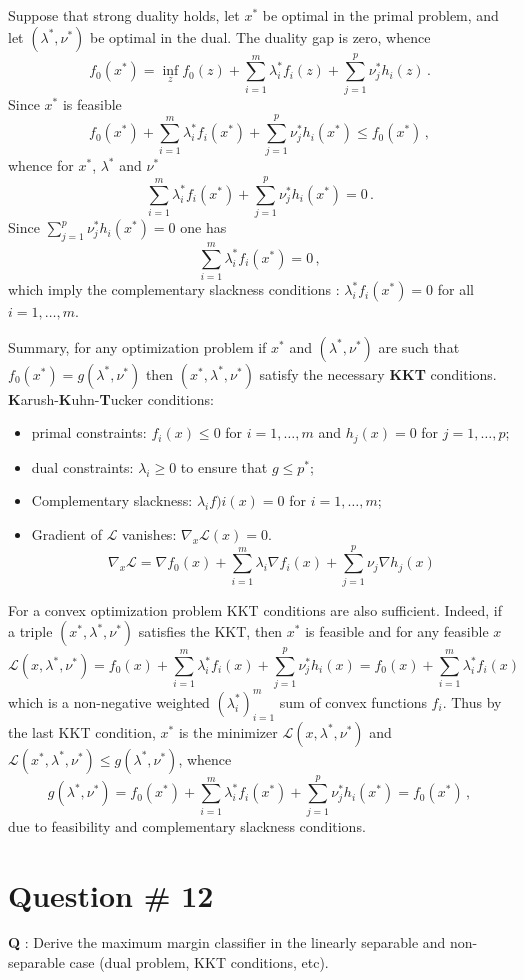 \documentclass[a4paper]{article}
\newcommand{\Lcal}{\mathcal{L}}
\begin{document}
Suppose that strong duality holds, let $x^*$ be optimal in the primal problem, and
let $(\lambda^*, \nu^*)$ be optimal in the dual. The duality gap is zero, whence
\[
f_0(x^*)
= \inf_z f_0(z) + \sum_{i=1}^m\lambda_i^* f_i(z) + \sum_{j=1}^p\nu_j^* h_i(z)\,.
\]
Since $x^*$ is feasible
\[
f_0(x^*) + \sum_{i=1}^m\lambda_i^* f_i(x^*) + \sum_{j=1}^p\nu_j^* h_i(x^*)
\leq f_0(x^*)\,,
\]
whence for $x^*$, $\lambda^*$ and $\nu^*$
\[
\sum_{i=1}^m \lambda_i^* f_i(x^*) + \sum_{j=1}^p\nu_j^* h_i(x^*) = 0 \,.
\]
Since $ \sum_{j=1}^p\nu_j^* h_i(x^*) = 0$ one has
\[ \sum_{i=1}^m \lambda_i^* f_i(x^*) = 0 \,,\]
which imply the complementary slackness conditions : $\lambda_i^* f_i(x^*) = 0$
for all $i=1,\ldots,m$.

Summary, for any optimization problem if $x^*$ and $(\lambda^*,\nu^*)$ are such that
$f_0(x^*) = g(\lambda^*,\nu^*)$ then $(x^*,\lambda^*,\nu^*)$ satisfy the necessary
\textbf{KKT} conditions.
\textbf{K}arush-\textbf{K}uhn-\textbf{T}ucker conditions:
\begin{itemize}
	\item primal constraints: $f_i(x)\leq 0$ for $i=1,\ldots,m$ and $h_j(x) = 0$ for $j=1,\ldots,p$;
	\item dual constraints: $\lambda_i \geq 0$ to ensure that $g\leq p^*$;
	\item Complementary slackness: $\lambda_i f)i(x) = 0$ for $i=1,\ldots,m$;
	\item Gradient of $\Lcal$ vanishes: $\nabla_x \Lcal(x) = 0$.
	\[\nabla_x \Lcal = \nabla f_0(x) + \sum_{i=1}^m \lambda_i \nabla f_i(x) + \sum_{j=1}^p \nu_j \nabla h_j(x)\]
\end{itemize}

For a convex optimization problem KKT conditions are also sufficient. Indeed, if
a triple $(x^*,\lambda^*,\nu^*)$ satisfies the KKT, then $x^*$ is feasible and
for any feasible $x$
\[
\Lcal(x,\lambda^*,\nu^*)
= f_0(x) + \sum_{i=1}^m\lambda_i^* f_i(x) + \sum_{j=1}^p\nu_j^* h_i(x)
= f_0(x) + \sum_{i=1}^m\lambda_i^* f_i(x)
\]
which is a non-negative weighted $(\lambda_i^*)_{i=1}^m$ sum of convex functions
$f_i$. Thus by the last KKT condition, $x^*$ is the minimizer $\Lcal(x,\lambda^*,\nu^*)$
and $\Lcal(x^*,\lambda^*,\nu^*) \leq g(\lambda^*, \nu^*)$, whence
\[
g(\lambda^*,\nu^*)
= f_0(x^*) + \sum_{i=1}^m \lambda_i^* f_i(x^*) + \sum_{j=1}^p\nu_j^* h_i(x^*)
= f_0(x^*)\,,
\]
due to feasibility and complementary slackness conditions.

\clearpage

\section[SVM]{Question \# 12} %
\label{sec:question_12}
\textbf{\large \textbf{Q}} : Derive the maximum margin classifier in the linearly
separable and non-separable case (dual problem, KKT conditions, etc).
\end{document}
